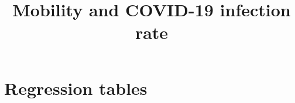 \documentclass{article}
\title{Mobility and COVID-19 infection rate}
\author{}
\date{}
\begin{document}
\maketitle

\section{Regression tables}

\end{document}
